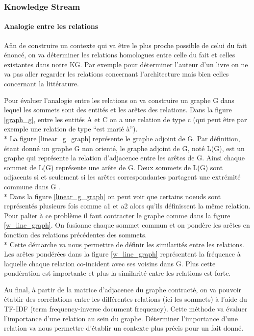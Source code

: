 \subsubsection{Knowledge Stream}
\label{sec:ks}

\paragraph{Analogie entre les relations}

Afin de construire un contexte qui va être le plus proche possible de celui du fait énoncé, on va déterminer les relations homologues entre celle du fait et celles existantes dans notre KG. Par exemple pour déterminer l'auteur d'un livre on ne va pas aller regarder les relations concernant l'architecture mais bien celles concernant la littérature.

Pour évaluer l'analogie entre les relations on va construire un graphe G dans lequel les sommets sont des entités et les arêtes des relations. Dans la figure \ref{graph_g},  entre les entités A et C on a une relation de type c (qui peut être par exemple une relation de type \enquote{est marié à}).
\\*
La figure \ref{linear_g_graph} représente le graphe adjoint de G. Par définition, étant donné un graphe G non orienté, le graphe adjoint de G, noté L(G), est un graphe qui représente la relation d'adjacence entre les arêtes de G. Ainsi chaque sommet de L(G) représente une arête de G. Deux sommets de L(G) sont adjacents si et seulement si les arêtes correspondantes partagent une extrémité commune dans G \cite{wiki:lg}.
\\* 
Dans la figure \ref{linear_g_graph} on peut voir que certains noeuds sont représentés plusieurs fois comme a1 et a2 alors qu'ils définissent la même relation. Pour palier à ce problème il faut contracter le graphe comme dans la figure \ref{w_line_graph}. On fusionne chaque sommet commun et on pondère les arêtes en fonction des relations précédentes des sommets.
\\*
Cette démarche va nous permettre de définir les similarités entre les relations. Les arêtes pondérées dans la figure \ref{w_line_graph} représentent la fréquence à laquelle chaque relation co-incident avec ses voisins dans G. Plus cette pondération est importante et plus la similarité entre les relations est forte.

Au final, à partir de la matrice d'adjacence du graphe contracté, on va pouvoir établir des corrélations entre les différentes relations (ici les sommets) à l'aide du TF-IDF (term frequency-inverse document frequency). Cette méthode va évaluer l'importance d'une relation au sein du graphe. Déterminer l'importance d'une relation va nous permettre d'établir un contexte plus précis pour un fait donné. 

